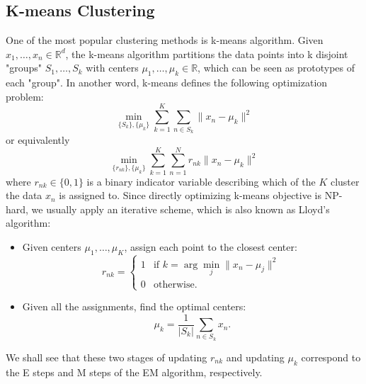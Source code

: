 \documentclass[../book-template.tex]{subfiles}
\begin{document}
\subsection{K-means Clustering}
One of the most popular clustering methods is k-means algorithm. Given $x_1,\dots,x_n\in \mathbb{R}^d$, the k-means algorithm partitions the data points into k disjoint "groups" $S_1,\dots,S_k$ with centers $\mu_1,\dots,\mu_k\in \mathbb{R}$, which can be seen as prototypes of each "group". In another word, k-means defines the following optimization problem:
\begin{equation*}
	\min_{\{S_k\},\{\mu_k\}}\sum_{k=1}^{K}\sum_{n\in S_k}\|x_n-\mu_k\|^2
\end{equation*}
or equivalently
\begin{equation*}
\min_{\{r_{nk}\},\{\mu_k\}}\sum_{k=1}^{K}\sum_{n=1}^{N}r_{nk}\|x_n-\mu_k\|^2
\end{equation*}
where $r_{nk}\in \{0,1\}$ is a binary indicator variable describing which of the $K$ cluster the data $x_n$ is assigned to. Since directly optimizing k-means objective is NP-hard, we usually apply an iterative scheme, which is also known as Lloyd's algorithm:
\begin{itemize}
	\item Given centers $\mu_1,\dots,\mu_K$, assign each point to the closest center:
	\begin{equation*}
		r_{nk}=\begin{cases}
		1& \text{if }k=\arg\min_j\|x_n-\mu_j\|^2\\
		0& \text{otherwise.}
		\end{cases}
	\end{equation*}
	\item Given all the assignments, find the optimal centers:
	\begin{equation*}
		\mu_k = \frac{1}{|S_k|}\sum_{n\in S_k}x_n.
	\end{equation*}
\end{itemize}
We shall see that these two stages of updating $r_{nk}$ and updating $\mu_k$ correspond to the E steps and M steps of the EM algorithm, respectively.
\end{document}

